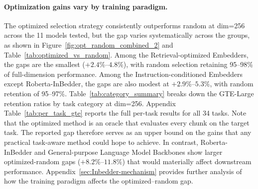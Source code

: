 \documentclass[11pt,a4paper]{article}
\begin{document}
\paragraph{Optimization gains vary by training paradigm.}
The optimized selection strategy consistently outperforms random at dim=256 across the 11 models tested, but the gap varies systematically across the groups, as shown in Figure~\ref{fig:opt_random_combined_2} and Table~\ref{tab:optimized_vs_random}. Among the Retrieval-optimized Embedders, the gaps are the smallest ($+2.4\%$--$4.8\%$), with random selection retaining 95--98\% of full-dimension performance. Among the Instruction-conditioned Embedders except Roberta-InBedder, the gaps are also modest at $+2.9\%$--$5.3\%$, with random retention of 95--97\%. Table~\ref{tab:category_summary} breaks down the GTE-Large retention ratios by task category at dim=256. Appendix Table~\ref{tab:per_task_gte} reports the full per-task results for all 34 tasks. Note that the optimized method is an oracle that evaluates every chunk on the target task. The reported gap therefore serves as an upper bound on the gains that any practical task-aware method could hope to achieve. In contrast, Roberta-InBedder and General-purpose Language Model Backbones show larger optimized-random gaps ($+8.2\%$--$11.8\%$) that would materially affect downstream performance. Appendix~\ref{sec:Inbedder-mechanism} provides further analysis of how the training paradigm affects the optimized--random gap.

\begin{table}[t]
    \centering
    \caption{Mean retention (\%) by task category for GTE-Large at dim=256. Values are averaged across all tasks within each category.}
    \label{tab:category_summary}
\end{table} 
\end{document}
